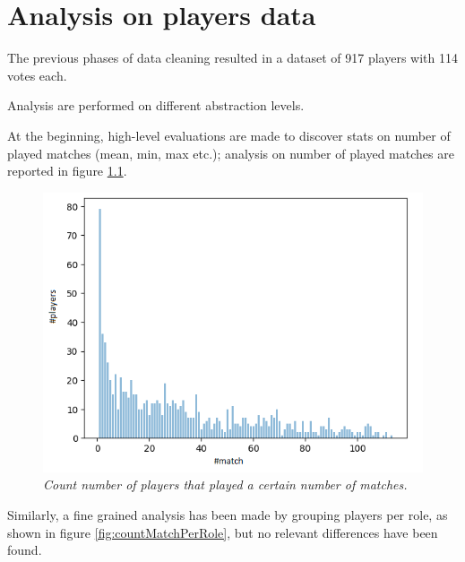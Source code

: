 \chapter {Analysis on players data}

The previous phases of data cleaning resulted in a dataset of 917 players with 114 votes each.

Analysis are performed on different abstraction levels.

At the beginning, high-level evaluations are made to discover stats on number of played matches (mean, min, max etc.); analysis on number of played matches are reported in figure \ref{fig:countMatch}.
\\
\begin{figure}[H]
  \includegraphics[scale=0.9]{images/img-01.png}
   \caption{\textit{Count number of players that played a certain number of matches.}}
  \label{fig:countMatch}
\end{figure}

Similarly, a fine grained analysis has been made by grouping players per role, as shown in figure \ref{fig:countMatchPerRole}, but no relevant differences have been found.

